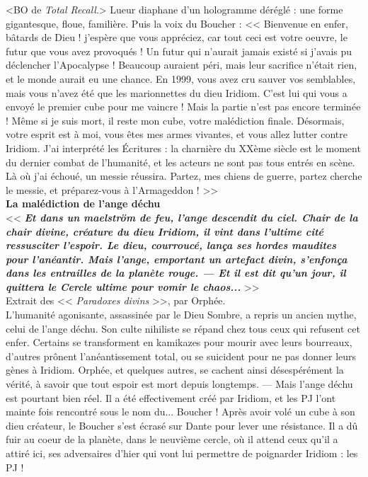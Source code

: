\documentclass[11pt,twoside,a4paper]{book}
\begin{document}
<BO de \emph{Total Recall}.> Lueur diaphane d'un hologramme d{\'e}r{\'e}gl{\'e} : une forme gigantesque, floue, famili{\`e}re. Puis la voix du Boucher : << Bienvenue en enfer, b{\^a}tards de Dieu ! j'esp{\`e}re que vous appr{\'e}ciez, car tout ceci est votre oeuvre, le futur que vous avez provoqu{\'e}s ! Un futur qui n'aurait jamais exist{\'e} si j'avais pu d{\'e}clencher l'Apocalypse ! Beaucoup auraient p{\'e}ri, mais leur sacrifice n'{\'e}tait rien, et le monde aurait eu une chance. En 1999, vous avez cru sauver vos semblables, mais vous n'avez {\'e}t{\'e} que les marionnettes du dieu Iridiom. C'est lui qui vous a envoy{\'e} le premier cube pour me vaincre ! Mais la partie n'est pas encore termin{\'e}e ! M{\^e}me si je suis mort, il reste mon cube, votre mal{\'e}diction finale. D{\'e}sormais, votre esprit est {\`a} moi, vous {\^e}tes mes armes vivantes, et vous allez lutter contre Iridiom. J'ai interpr{\'e}t{\'e} les {\'E}critures : la charni{\`e}re du XX{\`e}me si{\`e}cle est le moment du dernier combat de l'humanit{\'e}, et les acteurs ne sont pas tous entr{\'e}s en sc{\`e}ne. L{\`a} o{\`u} j'ai {\'e}chou{\'e}, un messie r{\'e}ussira. Partez, mes chiens de guerre, partez cherche le messie, et pr{\'e}parez-vous {\`a} l'Armageddon ! >>~\\

\textbf{\large La mal{\'e}diction de l'ange d{\'e}chu}~\\

<< \textbf{\emph{Et dans un maelstr{\"o}m de feu, l'ange descendit du ciel. Chair de la chair divine, cr{\'e}ature du dieu Iridiom, il vint dans l'ultime cit{\'e} ressusciter l'espoir. Le dieu, courrouc{\'e}, lan\c{c}a ses hordes maudites pour l'an{\'e}antir. Mais l'ange, emportant un artefact divin, s'enfon\c{c}a dans les entrailles de la plan{\`e}te rouge. --- Et il est dit qu'un jour, il quittera le Cercle ultime pour vomir le chaos...}} >>~\\
Extrait des << \emph{Paradoxes divins} >>, par Orph{\'e}e.~\\

L'humanit{\'e} agonisante, assassin{\'e}e par le Dieu Sombre, a repris un ancien mythe, celui de l'ange d{\'e}chu. Son culte nihiliste se r{\'e}pand chez tous ceux qui refusent cet enfer. Certains se transforment en kamikazes pour mourir avec leurs bourreaux, d'autres pr{\^o}nent l'an{\'e}antissement total, ou se suicident pour ne pas donner leurs g{\`e}nes {\`a} Iridiom. Orph{\'e}e, et quelques autres, se cachent ainsi d{\'e}sesp{\'e}r{\'e}ment la v{\'e}rit{\'e}, {\`a} savoir que tout espoir est mort depuis longtemps. --- Mais l'ange d{\'e}chu est pourtant bien r{\'e}el. Il a {\'e}t{\'e} effectivement cr{\'e}{\'e} par Iridiom, et les PJ l'ont mainte fois rencontr{\'e} sous le nom du... Boucher ! Apr{\`e}s avoir vol{\'e} un cube {\`a} son dieu cr{\'e}ateur, le Boucher s'est {\'e}cras{\'e} sur Dante pour lever une r{\'e}sistance. Il a d{\^u} fuir au coeur de la plan{\`e}te, dans le neuvi{\`e}me cercle, o{\`u} il attend ceux qu'il a attir{\'e} ici, ses adversaires d'hier qui vont lui permettre de poignarder Iridiom : les PJ !~\\
\end{document}
